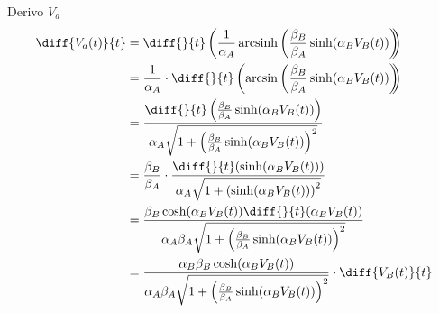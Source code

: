 \documentclass[12pt,a4paper,twoside,english,italian]{book}
\DeclareMathOperator{\arcsinh}{arcsinh}
\begin{document}
		Derivo $V_{a}$
		\begin{equation}
			\label{eq:derivata}
			\begin{split}
				\diff{V_{a}(t)}{t} &= \diff{}{t}\left(\frac{1}{\alpha_{A}} \arcsinh \left(\frac{\beta_{B}}{\beta_{A}} \sinh(\alpha_{B}V_{B}(t))\right)\hspace{-5px}\right)\\
				&= \frac{1}{\alpha_{A}}\cdot\diff{}{t}\left(\arcsin\left(\frac{\beta_{B}}{\beta_{A}}\sinh(\alpha_{B}V_{B}(t))\right)\hspace{-5px}\right)\\
				&= \frac{\diff{}{t}\left(\frac{\beta_{B}}{\beta_{A}}\sinh(\alpha_{B}V_{B}(t))\right)}{\alpha_{A}\sqrt{1+\left(\frac{\beta_{B}}{\beta_{A}}\sinh(\alpha_{B}V_{B}(t))\right)^{2}}}\\
				&= \frac{\beta_{B}}{\beta_{A}}\cdot\frac{\diff{}{t}(\sinh(\alpha_{B}V_{B}(t)))}{\alpha_{A}\sqrt{1+\left(\sinh(\alpha_{B}V_{B}(t))\right)^{2}}}\\
				&= \frac{\beta_{B}\cosh(\alpha_{B}V_{B}(t))\diff{}{t}(\alpha_{B}V_{B}(t))}{\alpha_{A}\beta_{A}\sqrt{1+\left(\frac{\beta_{B}}{\beta_{A}}\sinh(\alpha_{B}V_{B}(t))\right)^{2}}}\\
				&= \frac{\alpha_{B}\beta_{B}\cosh(\alpha_{B}V_{B}(t))}{\alpha_{A}\beta_{A}\sqrt{1+\left(\frac{\beta_{B}}{\beta_{A}}\sinh(\alpha_{B}V_{B}(t))\right)^{2}}}\cdot\diff{V_{B}(t)}{t}
			\end{split}
		\end{equation}
		
\end{document}

